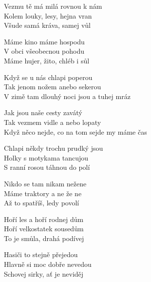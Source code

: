 
\ve{}
Vezmu tě má milá rovnou k nám\\
Kolem louky, lesy, hejna vran\\
Všude samá kráva, samej vůl

Máme kino máme hospodu\\
V obci všeobecnou pohodu\\
Máme hujer, žito, chléb i sůl

\cho{}
Když se u nás chlapi poperou\\
Tak jenom nožem anebo sekerou\\
V zimě tam dlouhý noci jsou a tuhej mráz

Jak jsou naše cesty zavátý\\
Tak vezmem vidle a nebo lopaty\\
Když něco nejde, co na tom sejde my máme čas

\ve{}
Chlapi někdy trochu prudký jsou\\
Holky s motykama tancujou\\
S ranní rosou táhnou do polí

Nikdo se tam nikam nežene\\
Máme traktory a ne že ne\\
Až to spatříš, ledy povolí

\cho{}

\ve{}
Hoří les a hoří rodnej dům\\
Hoří velkostatek sousedům\\
To je smůla, drahá podívej

Hasiči to stejně přejedou\\
Hlavně si moc dobře nevedou\\
Schovej sirky, ať je neviděj

\cho{}

\esong